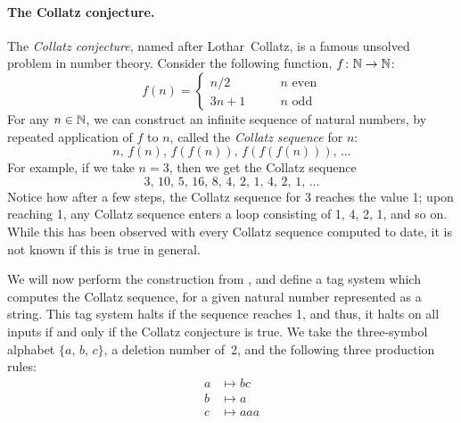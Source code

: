 \documentclass[../generics]{subfiles}
\begin{document}
\paragraph{The Collatz conjecture.} The \emph{Collatz conjecture}, named after Lothar~Collatz, is a famous unsolved problem in number theory. Consider the following function, $f\colon\mathbb{N}\rightarrow\mathbb{N}$:
\[
f(n) = \begin{cases}
n/2 &\qquad \mbox{$n$ even}\\
3n+1 &\qquad \mbox{$n$ odd}
\end{cases}
\]
For any $n\in\mathbb{N}$, we can construct an infinite sequence of natural numbers, by repeated application of $f$ to $n$, called the \emph{Collatz sequence} for $n$:
\[n,\,f(n),\,f(f(n)),\,f(f(f(n))),\,\ldots\]
For example, if we take $n=3$, then we get the Collatz sequence
\[3,\,10,\,5,\,16,\,8,\,4,\,2,\,1,\,4,\,2,\,1,\,\ldots\]
Notice how after a few steps, the Collatz sequence for 3 reaches the value 1; upon reaching 1, any Collatz sequence enters a loop consisting of 1, 4, 2, 1, and so on. While this has been observed with every Collatz sequence computed to date, it is not known if this is true in general.

We will now perform the construction from \cite{collatztag}, and define a tag system which computes the Collatz sequence, for a given natural number represented as a string. This tag system halts if the sequence reaches 1, and thus, it halts on all inputs if and only if the Collatz conjecture is true. We take the three-symbol alphabet $\{a,\,b,\,c\}$, a deletion number of~2, and the following three production rules:
\begin{align*}
a &\mapsto bc\\
b &\mapsto a\\
c &\mapsto aaa
\end{align*}
\end{document}

